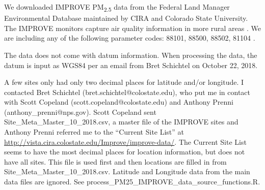 We downloaded IMPROVE PM\textsubscript{2.5} data from the Federal Land Manager Environmental Database maintained by CIRA and Colorado State University. The IMPROVE monitors capture air quality information in more rural areas \citep{EPANPM25IMPROVE2017}. We are including any of the following parameter codes: 88101, 88500, 88502, 81104 \citep{EPANPM25Memo2017,EPANPM25Parameters2017,EPANAllParameters2017}.

The data does not come with datum information. When processing the data, the datum is input as WGS84 per an email from Bret Schichtel on October 22, 2018.

A few sites only had only two decimal places for latitude and/or longitude. I contacted Bret Schichtel (bret.schichtel@colostate.edu), who put me in contact with Scott Copeland (scott.copeland@colostate.edu) and Anthony Prenni (anthony\_prenni@nps.gov). Scott Copeland sent Site\_Meta\_Master\_10\_2018.csv, a master file of the IMPROVE sites and Anthony Prenni referred me to the ``Current Site List'' at \url{http://vista.cira.colostate.edu/Improve/improve-data/}. The Current Site List seems to have the most decimal places for location information, but does not have all sites. This file is used first and then locations are filled in from Site\_Meta\_Master\_10\_2018.csv. Latitude and Longitude data from the main data files are ignored. See process\_PM25\_IMPROVE\_data\_source\_functions.R.
\bigskip

